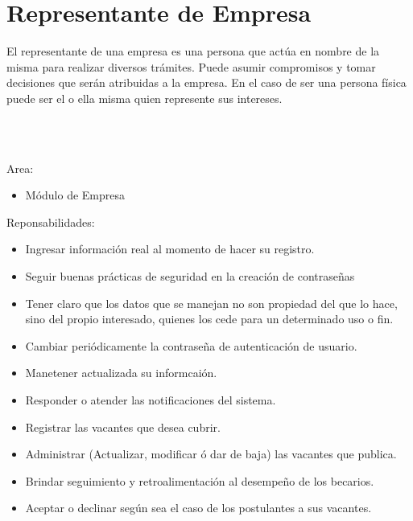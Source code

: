 \begin{Actor}{\hypertarget{Actor: Empresa}{\section{Representante de Empresa}}}{
El representante de una empresa es una persona que actúa en nombre de la misma para realizar diversos trámites. Puede asumir compromisos y tomar decisiones que serán atribuidas a la empresa. En el caso de ser una persona física puede ser el o ella misma quien represente sus intereses.
}

\\\\
\begin{list}{}{}
    \item[Area:] \ISenter
    \begin{itemize}
		\item Módulo de Empresa
    \end{itemize}
    \item[Reponsabilidades:] \ISenter
    \begin{itemize}
        \item Ingresar información real al momento de hacer su registro.
        \item Seguir buenas prácticas de seguridad en la creación de contraseñas
        \item  Tener claro que los datos que se manejan no son propiedad del que lo hace, sino del propio interesado, quienes los cede para un determinado uso o fin.
        \item Cambiar periódicamente la contraseña de autenticación de usuario.
		\item Manetener actualizada su informcaión.
		\item Responder o atender las notificaciones del sistema.
		\item Registrar las vacantes que desea cubrir.
		\item Administrar (Actualizar, modificar ó dar de baja) las vacantes que publica.
		\item Brindar seguimiento y retroalimentación al desempeño de los becarios.
		\item Aceptar o declinar según sea el caso de los postulantes a sus vacantes.
    \end{itemize}
\end{list}
    

\end{Actor}

